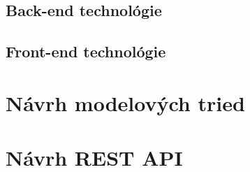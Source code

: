 \subsection{Back-end technológie}


\subsection{Front-end technológie}




\section{Návrh modelových tried}




\section{Návrh REST API}